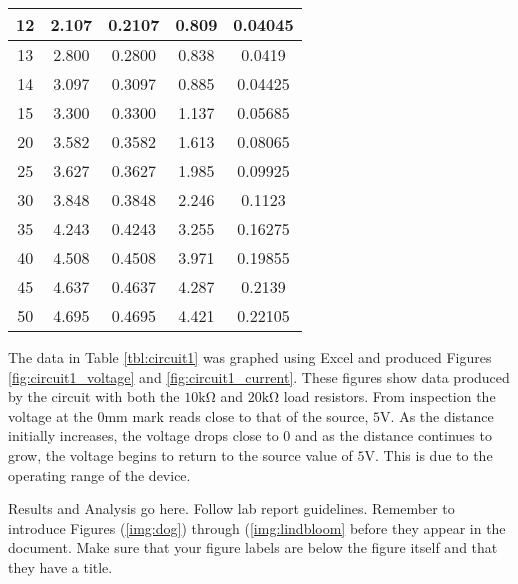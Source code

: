 \documentclass[CMPE]{KGCOEReport}
\begin{document}
\begin{table}[H]
\begin{tabular}{|c|c|c|c|c|}
		12            & 2.107          & 0.2107        & 0.809          & 0.04045       \\ \hline
		13            & 2.800          & 0.2800        & 0.838          & 0.0419        \\ \hline
		14            & 3.097          & 0.3097        & 0.885          & 0.04425       \\ \hline
		15            & 3.300          & 0.3300        & 1.137          & 0.05685       \\ \hline
		20            & 3.582          & 0.3582        & 1.613          & 0.08065       \\ \hline
		25            & 3.627          & 0.3627        & 1.985          & 0.09925       \\ \hline
		30            & 3.848          & 0.3848        & 2.246          & 0.1123        \\ \hline
		35            & 4.243          & 0.4243        & 3.255          & 0.16275       \\ \hline
		40            & 4.508          & 0.4508        & 3.971          & 0.19855       \\ \hline
		45            & 4.637          & 0.4637        & 4.287          & 0.2139        \\ \hline
		50            & 4.695          & 0.4695        & 4.421          & 0.22105       \\ \hline
	\end{tabular}
\end{table}

The data in Table \ref{tbl:circuit1} was graphed using Excel and produced Figures \ref{fig:circuit1_voltage}
and \ref{fig:circuit1_current}. These figures show data produced by the circuit with both the $10\si{\kilo\ohm}$
and $20\si{\kilo\ohm}$ load resistors. From inspection the voltage at the $0\si{\milli\meter}$ mark reads close to that
of the source, $5\si\volt$. As the distance initially increases, the voltage drops close to 0 and as the distance continues
to grow, the voltage begins to return to the source value of $5\si\volt$. This is due to the operating range of the device. 




Results and Analysis go here. Follow lab report guidelines. Remember to introduce Figures (\ref{img:dog}) through (\ref{img:lindbloom} before they appear in the document. Make sure that your figure labels are below the figure itself and that they have a title.
\end{document}
